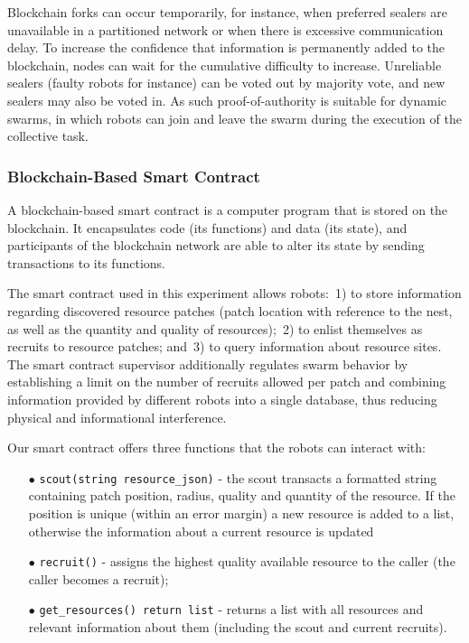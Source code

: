 \documentclass[runningheads]{llncs}
\newcommand{\poa}{proof-of-authority\xspace}
\begin{document}
Blockchain forks can occur temporarily, for instance, when preferred sealers are unavailable in a partitioned network or when there is excessive communication delay. To increase the confidence that information is permanently added to the blockchain, nodes can wait for the cumulative difficulty to increase. Unreliable sealers (faulty robots for instance) can be voted out by majority vote, and new sealers may also be voted in. As such \poa is suitable for dynamic swarms, in which robots can join and leave the swarm during the execution of the collective task.

\subsubsection{Blockchain-Based Smart Contract}
\label{sec:smart-contract}

A blockchain-based smart contract is a computer program that is stored on the blockchain. It encapsulates code (its functions) and data (its state), and participants of the blockchain network are able to alter its state by sending transactions to its functions. 

The smart contract used in this experiment allows robots:~1) to store information regarding discovered resource patches (patch location with reference to the nest, as well as the quantity and quality of resources);~2) to enlist themselves as recruits to resource patches; and~3) to query information about resource sites. The smart contract supervisor additionally regulates swarm behavior by establishing a limit on the number of recruits allowed per patch and combining information provided by different robots into a single database, thus reducing physical and informational interference.

Our smart contract offers three functions that the robots can interact with:
\begin{itemize}
	\item[$\bullet$] \texttt{scout(string resource\_json)} - the scout transacts a formatted string containing patch position, radius, quality and quantity of the resource. If the position is unique (within an error margin) a new resource is added to a list, otherwise the information about a current resource is updated
	\item[$\bullet$] \texttt{recruit()} - assigns the highest quality available resource to the caller (the caller becomes a recruit);
	\item[$\bullet$] \texttt{get\_resources() return list} - returns a list with all resources and relevant information about them (including the scout and current recruits).
\end{itemize}
\end{document}
